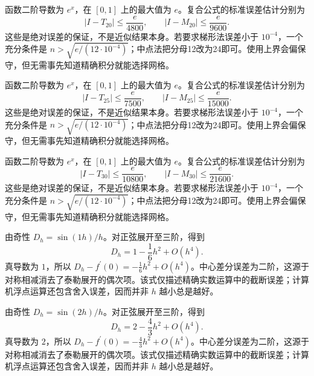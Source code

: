 \documentclass[UTF8,12pt,a4paper,fontset=fandol]{ctexart}
\begin{document}
\begin{solve}\label{ans:c18q16}
函数二阶导数为 $e^x$，在 $[0,1]$ 上的最大值为 $e$。复合公式的标准误差估计分别为
\[
|I-T_{20}|\le\frac e{4800},\qquad |I-M_{20}|\le\frac e{9600}.
\]
这些是绝对误差的保证，不是近似结果本身。若要求梯形法误差小于 $10^{-4}$，一个充分条件是 $n>\sqrt{e/(12\cdot10^{-4})}$；中点法把分母12改为24即可。使用上界会偏保守，但无需事先知道精确积分就能选择网格。
\end{solve}

\begin{solve}\label{ans:c18q17}
函数二阶导数为 $e^x$，在 $[0,1]$ 上的最大值为 $e$。复合公式的标准误差估计分别为
\[
|I-T_{25}|\le\frac e{7500},\qquad |I-M_{25}|\le\frac e{15000}.
\]
这些是绝对误差的保证，不是近似结果本身。若要求梯形法误差小于 $10^{-4}$，一个充分条件是 $n>\sqrt{e/(12\cdot10^{-4})}$；中点法把分母12改为24即可。使用上界会偏保守，但无需事先知道精确积分就能选择网格。
\end{solve}

\begin{solve}\label{ans:c18q18}
函数二阶导数为 $e^x$，在 $[0,1]$ 上的最大值为 $e$。复合公式的标准误差估计分别为
\[
|I-T_{30}|\le\frac e{10800},\qquad |I-M_{30}|\le\frac e{21600}.
\]
这些是绝对误差的保证，不是近似结果本身。若要求梯形法误差小于 $10^{-4}$，一个充分条件是 $n>\sqrt{e/(12\cdot10^{-4})}$；中点法把分母12改为24即可。使用上界会偏保守，但无需事先知道精确积分就能选择网格。
\end{solve}

\begin{solve}\label{ans:c18q19}
由奇性 $D_h=\sin(1h)/h$。对正弦展开至三阶，得到
\[
D_h=1-\frac{1}{6}h^2+O(h^4).
\]
真导数为 $1$，所以 $D_h-f^{\prime}(0)=-\frac{1}{6}h^2+O(h^4)$。中心差分误差为二阶，这源于对称相减消去了泰勒展开的偶次项。该式仅描述精确实数运算中的截断误差；计算机浮点运算还包含舍入误差，因而并非 $h$ 越小总是越好。
\end{solve}

\begin{solve}\label{ans:c18q20}
由奇性 $D_h=\sin(2h)/h$。对正弦展开至三阶，得到
\[
D_h=2-\frac{4}{3}h^2+O(h^4).
\]
真导数为 $2$，所以 $D_h-f^{\prime}(0)=-\frac{4}{3}h^2+O(h^4)$。中心差分误差为二阶，这源于对称相减消去了泰勒展开的偶次项。该式仅描述精确实数运算中的截断误差；计算机浮点运算还包含舍入误差，因而并非 $h$ 越小总是越好。
\end{solve}
\end{document}
